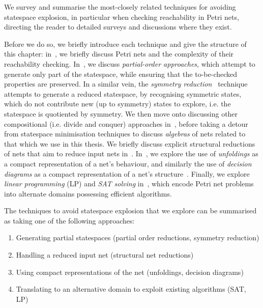 We survey and summarise the most-closely related techniques for avoiding
statespace explosion, in particular when checking reachability in Petri nets,
directing the reader to detailed surveys and discussions where they exist.

Before we do so, we briefly introduce each technique and give the structure of
this chapter: in~, we briefly discuss Petri
nets and the
complexity of their reachability checking.
In~, we discuss \emph{partial-order
approaches}, which attempt to generate only part of the statespace, while
ensuring that the to-be-checked properties are preserved. In a similar vein,
the \emph{symmetry reduction}~ technique attempts
to generate a reduced statespace, by recognising symmetric states, which do not
contribute new (up to symmetry) states to explore, i.e.  the statespace is
quotiented by symmetry. We then move onto discussing other compositional (i.e.
divide and conquer) approaches in~, before
taking a detour from statespace minimisation techniques to discuss
\emph{algebras} of nets related to that which we use in this thesis. We briefly
discuss explicit structural reductions of nets that aim to reduce input nets
in~. In~, we explore
the use of \emph{unfoldings} as a compact representation of a net's behaviour,
and similarly the use of \emph{decision diagrams} as a compact representation
of a net's structure~.  Finally, we explore
\emph{linear programming} (LP) and \emph{SAT solving} in~,
which encode Petri net problems into alternate domains possessing efficient
algorithms.

The techniques to avoid statespace explosion that we explore can be
summarised as taking one of the following approaches:
\begin{enumerate}
    \item Generating partial statespaces (partial order reductions, symmetry
        reduction)
    \item Handling a reduced input net (structural net reductions)
    \item Using compact representations of the net (unfoldings, decision
        diagrams)
    \item Translating to an alternative domain to exploit existing algorithms
        (SAT, LP)
\end{enumerate}

